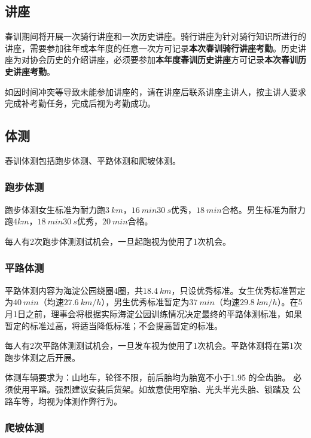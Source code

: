 \documentclass[UTF8]{ctexart}
\begin{document}
\subsection{讲座}


春训期间将开展一次骑行讲座和一次历史讲座。骑行讲座为针对骑行知识所进行的讲座，需要参加往年或本年度的任意一次方可记录\textbf{本次春训骑行讲座考勤}。历史讲座为对协会历史的介绍讲座，必须要参加\textbf{本年度春训历史讲座}方可记录\textbf{本次春训历史讲座考勤}。

如因时间冲突等导致未能参加讲座的，请在讲座后联系讲座主讲人，按主讲人要求完成补考勤任务，完成后视为考勤成功。

\subsection{体测}

春训体测包括跑步体测、平路体测和爬坡体测。

\subsubsection{跑步体测}

跑步体测女生标准为耐力跑$\SI{3}{km}$，$\SI{16}{min}\SI{30}{s}$优秀，$\SI{18}{min}$合格。男生标准为耐力跑$4km$，$\SI{18}{min}\SI{30}{s}$优秀，$\SI{20}{min}$合格。

每人有2次跑步体测测试机会，一旦起跑视为使用了1次机会。

\subsubsection{平路体测}

平路体测内容为海淀公园绕圈4圈，共$\SI{18.4}{km}$，只设优秀标准。女生优秀标准暂定为$\SI{40}{min}$（均速$\SI{27.6}{km/h}$），男生优秀标准暂定为$\SI{37}{min}$（均速$\SI{29.8}{km/h}$）。在5月1日之前，理事会将根据实际海淀公园训练情况决定最终的平路体测标准，如果暂定的标准过高，将适当降低标准；不会提高暂定的标准。

每人有2次平路体测测试机会，一旦发车视为使用了1次机会。平路体测将在第1次跑步体测之后开展。

体测车辆要求为：山地车，轮径不限，前后胎均为胎宽不小于1.95 的全齿胎。
必须使用平踏。强烈建议安装后货架。如故意使用窄胎、光头半光头胎、锁踏及
公路车等，均视为体测作弊行为。

\subsubsection{爬坡体测}
\end{document}
